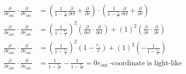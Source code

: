 \begin{equation}
    \begin{aligned}
        \frac{\partial}{\partial r_{\text {out }}} \cdot \frac{\partial}{\partial r_{\text {out }}} & =\left(\frac{1}{1-\frac{r_s}{r}} \frac{\partial}{\partial c t}+\frac{\partial}{\partial r}\right) \cdot\left(\frac{1}{1-\frac{r_s}{r}} \frac{\partial}{\partial c t}+\frac{\partial}{\partial r}\right) \\
        \frac{\partial}{\partial r_{\text {out }}} \cdot \frac{\partial}{\partial r_{\text {out }}} & =\left(\frac{1}{1-\frac{r_s}{r}}\right)^2\left(\frac{\partial}{\partial c t} \cdot \frac{\partial}{\partial c t}\right)+(1)^2\left(\frac{\partial}{\partial r} \cdot \frac{\partial}{\partial r}\right) \\
        \frac{\partial}{\partial r_{\text {out }}} \cdot \frac{\partial}{\partial r_{\text {out }}} & =\left(\frac{1}{1-\frac{r_s}{r}}\right)^2\left(1-\frac{r_s}{r}\right)+(1)^2\left(-\frac{1}{1-\frac{r_s}{r}}\right)                                                                                      \\
        \frac{\partial}{\partial r_{\text {out }}} \cdot \frac{\partial}{\partial r_{\text {out }}} & =\frac{1}{1-\frac{r_s}{r}}-\frac{1}{1-\frac{r_s}{r}}=0 r_{\text {out }} \text {-coordinate is light-like }
    \end{aligned}
\end{equation}


